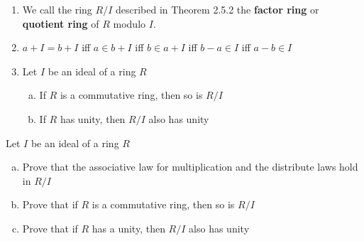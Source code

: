 \begin{remark} \phantom{blank}
    \begin{enumerate}
        \item We call the ring $R/I$ described in Theorem 2.5.2 the \textbf{factor ring} or \textbf{quotient ring} of $R$ modulo $I$.
        \item $a + I = b + I$ iff $a \in b + I$ iff $b \in a + I$ iff $b - a \in I$ iff $a - b \in I$
        \item Let $I$  be an ideal of a ring $R$
        \begin{enumerate}[(a)]
            \item If $R$ is a commutative ring, then so is $R/I$
            \item If $R$ has unity, then $R/I$ also has unity
        \end{enumerate}
    \end{enumerate}
\end{remark}

\begin{exercise}
    Let $I$  be an ideal of a ring $R$
    \begin{enumerate}[(a)]
        \item Prove that the associative law for multiplication and the distribute laws hold in $R/I$
        \item Prove that if $R$ is a commutative ring, then so is $R/I$
        \item Prove that if $R$ has a unity, then $R/I$ also has unity
    \end{enumerate}
\end{exercise}

